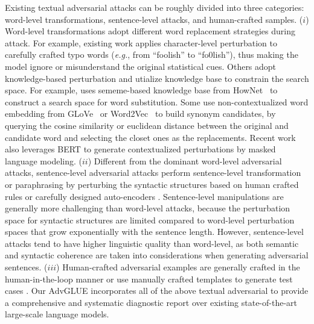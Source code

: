 \documentclass{article}
\newcommand{\method}{AdvGLUE\xspace}
\begin{document}
Existing textual adversarial attacks can be roughly divided into three categories: word-level transformations, sentence-level attacks, and human-crafted samples. ($i$) Word-level transformations adopt different word replacement strategies during attack. For example, existing work \citep{textbugger, hotflip} applies character-level perturbation to carefully crafted typo words (\emph{e.g.}, from ``foolish'' to ``fo0lish''), thus making the model ignore or misunderstand the original statistical cues.  Others adopt knowledge-based perturbation and utialize knowledge base to constrain the search space. For example, \citet{comattack} uses sememe-based knowledge base from HowNet~\citep{hownet} to construct a search space for word substitution. Some \citep{textfooler, textbugger}  use non-contextualized word embedding from  GLoVe~\citep{DBLP:conf/emnlp/PenningtonSM14} or Word2Vec~\citep{DBLP:conf/nips/MikolovSCCD13} to build synonym candidates, by querying the cosine similarity or euclidean distance between the original and candidate word and selecting the closet ones as the replacements. Recent work \citep{bae,
bertattack} also leverages BERT to generate contextualized perturbations by masked language modeling. 
($ii$) Different from the dominant word-level adversarial attacks, sentence-level adversarial attacks perform sentence-level transformation or paraphrasing by perturbing the syntactic structures based on human crafted rules \citep{stresstest, checklist} or carefully designed auto-encoders \citep{scpn, t3}.  Sentence-level manipulations are generally more challenging than word-level attacks, because the perturbation space for syntactic structures are limited compared to word-level perturbation spaces that grow exponentially with the sentence length. However, sentence-level attacks tend to have higher linguistic quality than word-level, as both semantic and syntactic coherence are taken into considerations when generating adversarial sentences.
($iii$) Human-crafted adversarial examples are generally crafted in the human-in-the-loop manner \citep{advsquad,anli,dynabenchqa} or use manually crafted templates to generate test cases \citep{stresstest,checklist}. Our \method incorporates all of the above textual adversarial to provide a comprehensive and systematic diagnostic report over existing state-of-the-art large-scale language models.
\end{document}
